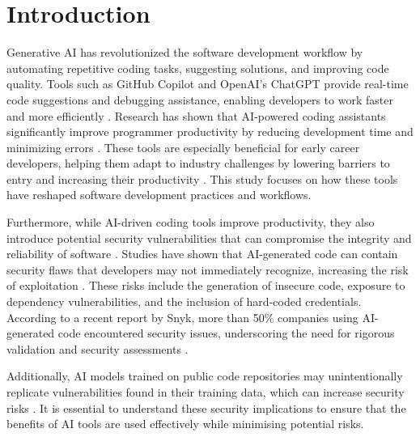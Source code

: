 \section{Introduction}

Generative AI has revolutionized the software development workflow by automating repetitive coding tasks, suggesting solutions, and improving code quality. Tools such as GitHub Copilot and OpenAI's ChatGPT provide real-time code suggestions and debugging assistance, enabling developers to work faster and more efficiently \cite{tools}. Research has shown that AI-powered coding assistants significantly improve programmer productivity by reducing development time and minimizing errors \cite{ferdiana2024}. These tools are especially beneficial for early career developers, helping them adapt to industry challenges by lowering barriers to entry and increasing their productivity \cite{ferdiana2024}. This study focuses on how these tools have reshaped software development practices and workflows. 

Furthermore, while AI-driven coding tools improve productivity, they also introduce potential security vulnerabilities that can compromise the integrity and reliability of software \cite{security-vulnerabilities}. Studies have shown that AI-generated code can contain security flaws that developers may not immediately recognize, increasing the risk of exploitation \cite{snyk2023}. These risks include the generation of insecure code, exposure to dependency vulnerabilities, and the inclusion of hard-coded credentials. According to a recent report by Snyk, more than 50\% companies using AI-generated code encountered security issues, underscoring the need for rigorous validation and security assessments \cite{snyk2023}. 

Additionally, AI models trained on public code repositories may unintentionally replicate vulnerabilities found in their training data, which can increase security risks \cite{ai-training-risks}. It is essential to understand these security implications to ensure that the benefits of AI tools are used effectively while minimising potential risks.


